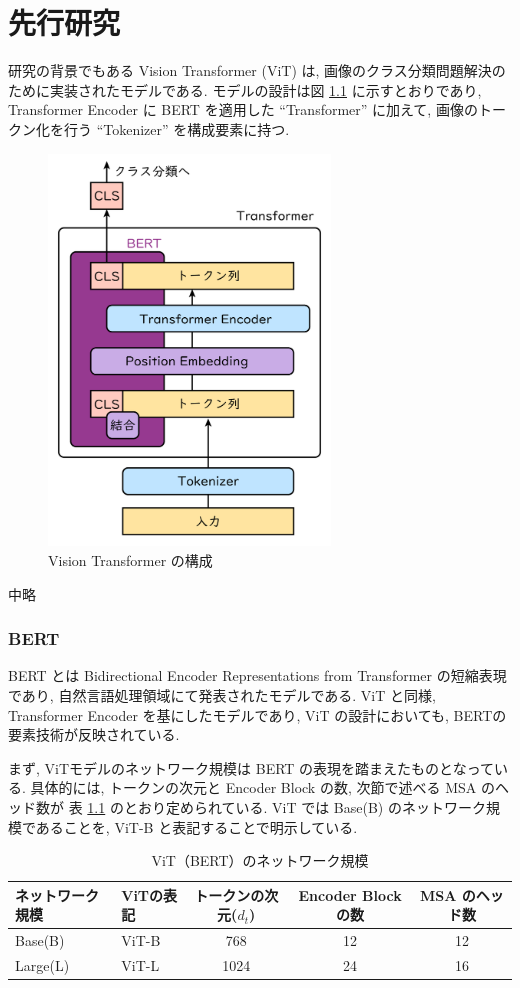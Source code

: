 \chapter{先行研究}\label{sec:RecentWorks}

研究の背景でもある Vision Transformer (ViT) \cite{Dosovitskiy_2021} は,
画像のクラス分類問題解決のために実装されたモデルである. 
モデルの設計は図 \ref{fig:vit_design} に示すとおりであり, 
Transformer Encoder \cite{Vaswani_2017} に BERT \cite{Devlin_2019} を適用した
``Transformer'' に加えて, 画像のトークン化を行う ``Tokenizer'' を構成要素に持つ. 
\begin{figure}[htbp]
  \centering
  \includegraphics[keepaspectratio, width=75mm]{figure/vit_design.png}
  \caption{Vision Transformer の構成}
  \label{fig:vit_design}
\end{figure}

中略

\subsection{BERT}
\label{sec:bert}
BERT \cite{Devlin_2019} とは Bidirectional Encoder Representations from
Transformer の短縮表現であり, 自然言語処理領域にて発表されたモデルである.
ViT と同様, Transformer Encoder を基にしたモデルであり,
ViT の設計においても, BERTの要素技術が反映されている.

まず, ViTモデルのネットワーク規模は BERT の表現を踏まえたものとなっている.
具体的には, トークンの次元と Encoder Block の数, 次節で述べる MSA のヘッド数が
表 \ref{table:vit-netsize} のとおり定められている. 
ViT では Base(B) のネットワーク規模であることを, ViT-B と表記することで明示している. 
\begin{table}[h]
 \caption{ViT（BERT）のネットワーク規模}
 \label{table:vit-netsize}
 \centering
  \begin{tabular}{llccc}
   \hline
   ネットワーク規模 & ViTの表記 & トークンの次元($d_{t}$) & Encoder Block の数 
   & MSA のヘッド数 \\
   \hline \hline
   Base(B) & ViT-B & 768 & 12 & 12 \\
   Large(L) & ViT-L & 1024 & 24 & 16 \\
   \hline
  \end{tabular}
\end{table}

